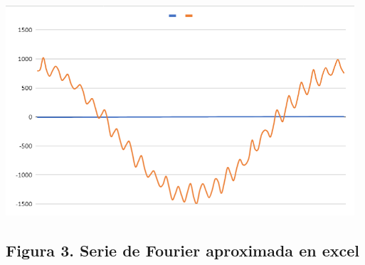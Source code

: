 \includegraphics[width=5.10573in,height=3.08055in]{media/image16.png}

\subsection{Figura 3. Serie de Fourier aproximada en excel}
